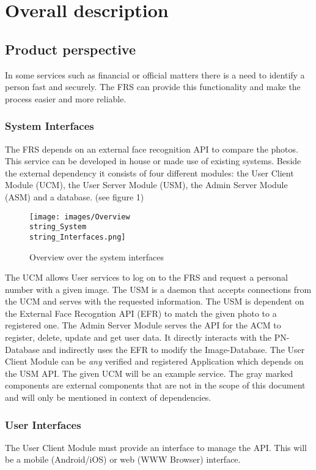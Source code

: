 \documentclass[a4paper,11pt]{article}
\begin{document}
\newpage
\section{Overall description}

\subsection{Product perspective}
In some services such as financial or official matters there is a need to identify a person fast and securely. The FRS can provide this functionality and make the process easier and more reliable.

\subsubsection{System Interfaces}
The FRS depends on an external face recognition API to compare the photos. This service can be developed in house or made use of existing systems. Beside the external dependency it consists of four different modules: the User Client Module (UCM), the User Server Module (USM), the Admin Server Module (ASM) and a database. (see figure 1)
\begin{figure}[h!]
	\centering
	\label{System Interfaces}
	\texttt{[image: images/Overview\\string\_System\\string\_Interfaces.png]} 
	\caption{Overview over the system interfaces}
\end{figure}
\newpage
\noindent
The UCM allows User services to log on to the FRS and request a personal number with a given image. The USM is a daemon that accepts connections from the UCM and serves with the requested information. The USM is dependent on the External Face Recogntion API (EFR) to match the given photo to a registered one. The Admin Server Module serves the API for the ACM to register, delete, update and get user data. It directly interacts with the PN-Database and indirectly uses the EFR to modify the Image-Database.
\newline
\noindent
The User Client Module can be \textit{any} verified and registered Application which depends on the USM API. The given UCM will be an example service. The gray marked components are external components that are not in the scope of this document and will only be mentioned in context of dependencies. 

\subsubsection{User Interfaces}
The User Client Module must provide an interface to manage the API. This will be a mobile (Android/iOS) or web (WWW Browser) interface. 
\end{document}
